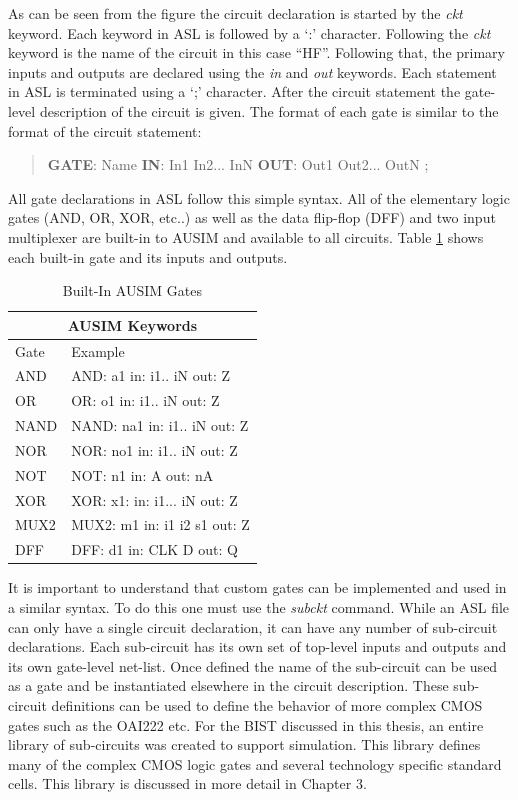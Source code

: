 \documentclass[12pt]{report}
\begin{document}
As can be seen from the figure the circuit declaration is started by the \textit{ckt} keyword\cite{asl}.  Each keyword in ASL is followed by a `:' character\cite{asl}.  Following the \textit{ckt} keyword is the name of the circuit in this case ``HF''.  Following that, the primary inputs and outputs are declared using the \textit{in} and \textit{out} keywords.  Each statement in ASL is terminated using a `;' character\cite{asl}.  After the circuit statement the gate-level description of the circuit is given.  The format of each gate is similar to the format of the circuit statement:
\begin{quote}
	\textbf{GATE}: Name \textbf{IN}: In1 In2... InN \textbf{OUT}: Out1 Out2... OutN ;\cite{asl}
\end{quote}
All gate declarations in ASL follow this simple syntax.  All of the elementary logic gates (AND, OR, XOR, etc..) as well as the data flip-flop (DFF) and two input multiplexer are built-in to AUSIM and available to all circuits\cite{asl}.  Table \ref{tbl:ASLGates} shows each built-in gate and its inputs and outputs.
\begin{table}[bht]
\caption{Built-In AUSIM Gates\cite{asl}}
\begin{center}
\begin{tabular}{|l|l|}
\hline
\multicolumn{2}{|c|}{AUSIM Keywords} \\ \hline
Gate & Example \\ \hline
AND & AND: a1 in: i1.. iN out: Z \\ \hline
OR & OR: o1 in: i1.. iN out: Z \\ \hline
NAND & NAND: na1 in: i1.. iN out: Z \\ \hline
NOR & NOR: no1 in: i1.. iN out: Z \\ \hline
NOT & NOT: n1 in: A out: nA \\ \hline
XOR & XOR: x1: in: i1... iN out: Z \\ \hline
MUX2 & MUX2: m1 in: i1 i2 s1 out: Z \\ \hline
DFF & DFF: d1 in: CLK D out: Q \\ \hline
\end{tabular}
\end{center}
\label{tbl:ASLGates}
\end{table}

It is important to understand that custom gates can be implemented and used in a similar syntax.  To do this one must use the \textit{subckt} command.  While an ASL file can only have a single circuit declaration, it can have any number of sub-circuit declarations\cite{asl}.  Each sub-circuit has its own set of top-level inputs and outputs and its own gate-level net-list.  Once defined the name of the sub-circuit can be used as a gate and be instantiated elsewhere in the circuit description.  These sub-circuit definitions can be used to define the behavior of more complex CMOS gates such as the OAI222 etc.  For the BIST discussed in this thesis, an entire library of sub-circuits was created to support simulation.  This library defines many of the complex CMOS logic gates and several technology specific standard cells.  This library is discussed in more detail in Chapter 3.
\end{document}
